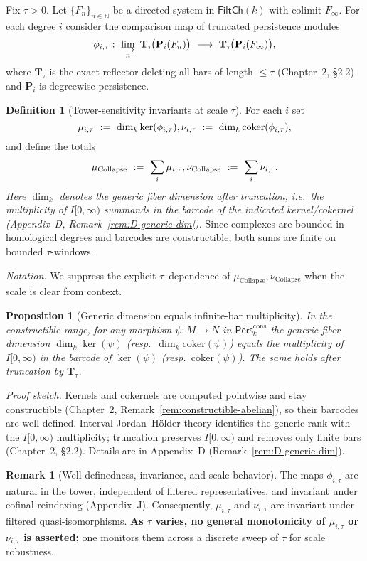 \documentclass[11pt]{article}
\newcommand{\Pers}{\mathsf{Pers}}
\numberwithin{equation}{section}
\newtheorem{proposition}[theorem]{Proposition}
\theoremstyle{definition}
\newtheorem{definition}[theorem]{Definition}
\newtheorem{remark}[theorem]{Remark}
\DeclareRobustCommand{\muc}{\mu_{\mathrm{Collapse}}}
\DeclareRobustCommand{\nuc}{\nu_{\mathrm{Collapse}}}
\providecommand{\n}{\unskip\space}
\begin{document}
\medskip
Fix $\tau>0$. Let $\{F_n\}_{n\in\mathbb{N}}$ be a directed system in $\mathsf{FiltCh}(k)$ with colimit $F_\infty$. For each degree $i$ consider the comparison map of truncated persistence modules
\[
\phi_{i,\tau}:\ \varinjlim_{n}\ \mathbf{T}_\tau\!\big(\mathbf{P}_i(F_n)\big)\ \longrightarrow\ \mathbf{T}_\tau\!\big(\mathbf{P}_i(F_\infty)\big),
\]
where $\mathbf{T}_\tau$ is the exact reflector deleting all bars of length $\le\tau$ (Chapter~2, §2.2) and $\mathbf{P}_i$ is degreewise persistence.

\begin{definition}[Tower-sensitivity invariants at scale $\tau$]\label{def:mu-nu}
For each $i$ set
\[
\mu_{i,\tau}\ :=\ \dim_k \ker(\phi_{i,\tau}),\qquad\n\nu_{i,\tau}\ :=\ \dim_k \mathrm{coker}(\phi_{i,\tau}),
\]
and define the totals
\[
\muc\ :=\ \sum_i \mu_{i,\tau},\qquad\n\nuc\ :=\ \sum_i \nu_{i,\tau}.
\]
\emph{Here $\dim_k$ denotes the \emph{generic fiber} dimension after truncation, i.e.\ the multiplicity of $I[0,\infty)$ summands in the barcode of the indicated kernel/cokernel (Appendix~D, Remark~\ref{rem:D-generic-dim}).} Since complexes are bounded in homological degrees and barcodes are constructible, both sums are finite on bounded $\tau$-windows.
\end{definition}

\noindent\emph{Notation.} We suppress the explicit $\tau$–dependence of $\muc,\nuc$ when the scale is clear from context.

\begin{proposition}[Generic dimension equals infinite-bar multiplicity]\label{prop:generic-dimension-barcode}
In the constructible range, for any morphism $\psi:M\to N$ in $\Pers^{\mathrm{cons}}_k$ the generic fiber dimension
$\dim_k\ker(\psi)$ (resp.\ $\dim_k\mathrm{coker}(\psi)$) equals the multiplicity of $I[0,\infty)$ in the barcode of $\ker(\psi)$ (resp.\ $\mathrm{coker}(\psi)$). The same holds after truncation by $\mathbf{T}_\tau$.
\end{proposition}

\noindent\emph{Proof sketch.} Kernels and cokernels are computed pointwise and stay constructible (Chapter~2, Remark~\ref{rem:constructible-abelian}), so their barcodes are well-defined. Interval Jordan–Hölder theory identifies the generic rank with the $I[0,\infty)$ multiplicity; truncation preserves $I[0,\infty)$ and removes only finite bars (Chapter~2, §2.2). Details are in Appendix~D (Remark~\ref{rem:D-generic-dim}).

\begin{remark}[Well-definedness, invariance, and scale behavior]
The maps $\phi_{i,\tau}$ are natural in the tower, independent of filtered representatives, and invariant under cofinal reindexing (Appendix~J). Consequently, $\mu_{i,\tau}$ and $\nu_{i,\tau}$ are invariant under filtered quasi-isomorphisms. \textbf{As $\tau$ varies, no general monotonicity of $\mu_{i,\tau}$ or $\nu_{i,\tau}$ is asserted;} one monitors them across a discrete sweep of $\tau$ for scale robustness.
\end{remark}
\end{document}
